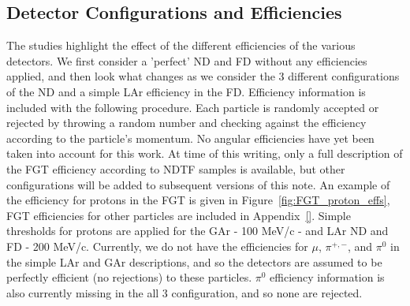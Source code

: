 \documentclass[12pt]{article}
\begin{document}
\subsection{Detector Configurations and Efficiencies}
\label{subsec:eff}
The studies highlight the effect of the different efficiencies of the various detectors. We first consider a 'perfect' ND and FD without any efficiencies applied, and then look what changes as we consider the 3 different configurations of the ND and a simple LAr efficiency in the FD. Efficiency information is included with the following procedure. Each particle is randomly accepted or rejected by throwing a random number and checking against the efficiency according to the particle's momentum. No angular efficiencies have yet been taken into account for this work. At time of this writing, only a full description of the FGT efficiency according to NDTF samples is available, but other configurations will be added to subsequent versions of this note. An example of the efficiency for protons in the FGT is given in Figure~\ref{fig:FGT_proton_effs}, FGT efficiencies for other particles are included in Appendix~\ref{}. Simple thresholds for protons are applied for the GAr - 100 MeV/c - and LAr ND and FD - 200 MeV/c. Currently, we do not have the efficiencies for $\mu$, $\pi^{+,-}$, and $\pi^{0}$ in the simple LAr and GAr descriptions, and so the detectors are assumed to be perfectly efficient (no rejections) to these particles. $\pi^0$ efficiency information is also currently missing in the all 3 configuration, and so none are rejected. 
\end{document}
